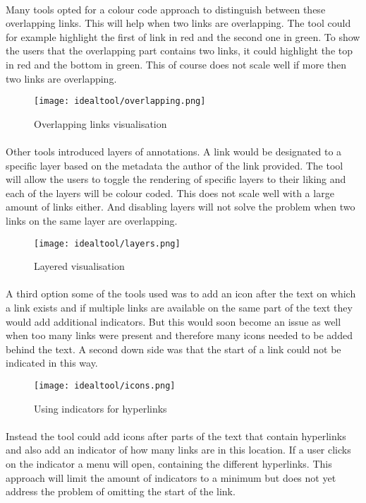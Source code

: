 	\paragraph{}
	Many tools opted for a colour code approach to distinguish between these overlapping links. This will help when two links are overlapping. The tool could for example highlight the first of link in red and the second one in green. To show the users that the overlapping part contains two links, it could highlight the top in red and the bottom in green. This of course does not scale well if more then two links are overlapping.
	\begin{figure}[h]
		\centering
		\texttt{[image: idealtool/overlapping.png]}
		\caption{Overlapping links visualisation}
	\end{figure}
	\paragraph{}
	Other tools introduced layers of annotations. A link would be designated to a specific layer based on the metadata the author of the link provided. The tool will allow the users to toggle the rendering of specific layers to their liking and each of the layers will be colour coded. This does not scale well with a large amount of links either. And disabling layers will not solve the problem when two links on the same layer are overlapping.
	\begin{figure}[h]
		\centering
		\texttt{[image: idealtool/layers.png]}
		\caption{Layered visualisation}
	\end{figure}
	
	\paragraph{}
	A third option some of the tools used was to add an icon after the text on which a link exists and if multiple links are available on the same part of the text they would add additional indicators. But this would soon become an issue as well when too many links were present and therefore many icons needed to be added behind the text. A second down side was that the start of a link could not be indicated in this way.
	\begin{figure}[h]
		\centering
		\texttt{[image: idealtool/icons.png]}
		\caption{Using indicators for hyperlinks~\cite{bottoni2004madcow}}
	\end{figure}
	\paragraph{}
	Instead the tool could add icons after parts of the text that contain hyperlinks and also add an indicator of how many links are in this location. If a user clicks on the indicator a menu will open, containing the different hyperlinks. This approach will limit the amount of indicators to a minimum but does not yet address the problem of omitting the start of the link.
